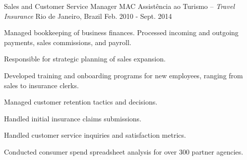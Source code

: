 \begin{cventries}
\cventry
{Sales and Customer Service Manager} %
{MAC Assistência ao Turismo \textmd{-- \em{Travel Insurance}}} %
{Rio de Janeiro, Brazil} %
{Feb. 2010 - Sept. 2014} %
{ %
\begin{cvitems}
\item {Managed bookkeeping of business finances. Processed incoming and outgoing payments, sales commissions, and payroll.}
\item {Responsible for strategic planning of sales expansion.}
\item {Developed training and onboarding programs for new employees, ranging from sales to insurance clerks.}
\item {Managed customer retention tactics and decisions.}
\item {Handled initial insurance claims submissions.}
\item {Handled customer service inquiries and satisfaction metrics.}
\item {Conducted consumer spend spreadsheet analysis for over 300 partner agencies.}
\end{cvitems}
}



\end{cventries}